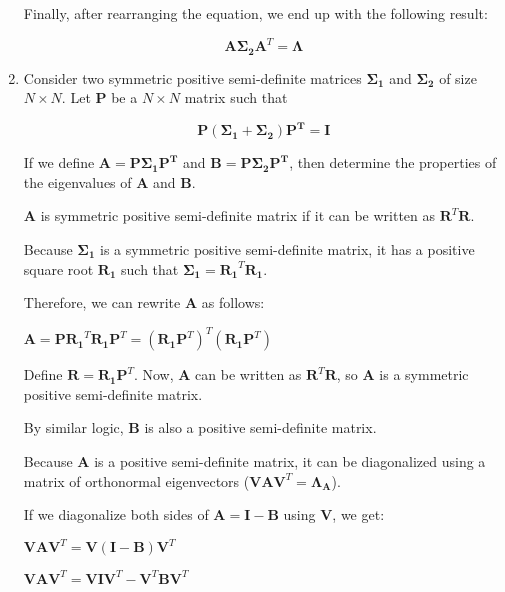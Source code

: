 \documentclass[fleqn]{article}
\begin{document}
\begin{enumerate}
		Finally, after rearranging the equation, we end up with the following result:
		
		\begin{equation*}
			\mathbf{A}\mathbf{\Sigma_2}\mathbf{A}^T = \mathbf{\Lambda}
		\end{equation*}
		
		\item Consider two symmetric positive semi-definite matrices $\mathbf{\Sigma_1}$ and $\mathbf{\Sigma_2}$ of size $N \times N$. Let $\mathbf{P}$ be a $N \times N$ matrix such that
		
		\begin{equation*}
			\mathbf{P}(\mathbf{\Sigma_1} + \mathbf{\Sigma_2})\mathbf{P^T} = \mathbf{I}
		\end{equation*}
		
		If we define $\mathbf{A} = \mathbf{P}\mathbf{\Sigma_1}\mathbf{P^T}$ and $\mathbf{B} = \mathbf{P}\mathbf{\Sigma_2}\mathbf{P^T}$, then determine the properties of the eigenvalues of $\mathbf{A}$ and $\mathbf{B}$.
		
		$\mathbf{A}$ is symmetric positive semi-definite matrix if it can be written as $\mathbf{R}^T\mathbf{R}$.
		
		Because $\mathbf{\Sigma_1}$ is a symmetric positive semi-definite matrix, it has a positive square root $\mathbf{R_1}$ such that $\mathbf{\Sigma_1} = \mathbf{R_1}^T\mathbf{R_1}$.
		
		Therefore, we can rewrite $\mathbf{A}$ as follows:
		
		$\mathbf{A} = \mathbf{P}\mathbf{R_1}^T\mathbf{R_1}\mathbf{P}^T = (\mathbf{R_1}\mathbf{P}^T)^T(\mathbf{R_1}\mathbf{P}^T)$

		Define $\mathbf{R} = \mathbf{R_1}\mathbf{P}^T$. Now, $\mathbf{A}$ can be written as $\mathbf{R}^T\mathbf{R}$, so $\mathbf{A}$ is a symmetric positive semi-definite matrix.
		
		By similar logic, $\mathbf{B}$ is also a positive semi-definite matrix.
		
		Because $\mathbf{A}$ is a positive semi-definite matrix, it can be diagonalized using a matrix of orthonormal eigenvectors ($\mathbf{V}\mathbf{A}\mathbf{V}^T = \mathbf{\Lambda_A}$).
		
		If we diagonalize both sides of $\mathbf{A} = \mathbf{I} - \mathbf{B}$ using $\mathbf{V}$, we get:
		
		$\mathbf{V}\mathbf{A}\mathbf{V}^T = \mathbf{V}(\mathbf{I} - \mathbf{B})\mathbf{V}^T$
		
		$\mathbf{V}\mathbf{A}\mathbf{V}^T = \mathbf{V}\mathbf{I}\mathbf{V}^T - \mathbf{V}^T\mathbf{B}\mathbf{V}^T$
		

\end{enumerate}
\end{document}
